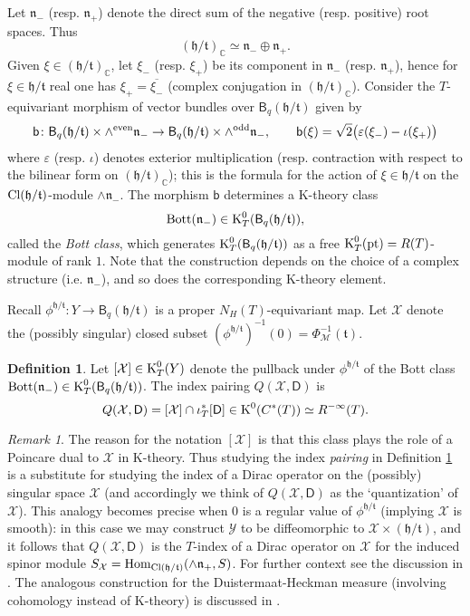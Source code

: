 \documentclass[11pt,reqno]{amsart}
\theoremstyle{definition}
\newtheorem{definition}[theorem]{Definition}
\theoremstyle{remark}
\newtheorem{remark}[theorem]{Remark}
\newcommand{\ol}[1]{\overline{#1}}
\newcommand{\st}[1]{\mathsf{#1}}
\newcommand{\tn}[1]{\textnormal{#1}}
\def\t{\ensuremath{\mathfrak{t}}}
\def\h{\ensuremath{\mathfrak{h}}}
\def\n{\ensuremath{\mathfrak{n}}}
\def\Y{\ensuremath{\mathcal{Y}}}
\def\K{\ensuremath{\mathcal{K}}}
\def\X{\ensuremath{\mathcal{X}}}
\def\M{\ensuremath{\mathcal{M}}}
\def\bC{\ensuremath{\mathbb{C}}}
\def\Hom{\ensuremath{\textnormal{Hom}}}
\def\Cl{\ensuremath{\textnormal{Cl}}}
\def\pt{\ensuremath{\textnormal{pt}}}
\def\K{\ensuremath{\textnormal{K}}}
\def\Bott{\ensuremath{\textnormal{Bott}}}
\begin{document}
Let $\n_-$ (resp. $\n_+$) denote the direct sum of the negative (resp. positive) root spaces.  Thus 
\[ (\h/\t)_{\bC} \simeq \n_- \oplus \n_+. \]
Given $\xi \in (\h/\t)_{\bC}$, let $\xi_-$ (resp. $\xi_+$) be its component in $\n_-$ (resp. $\n_+$), hence for $\xi \in \h/\t$ real one has $\xi_+=\ol{\xi_-}$ (complex conjugation in $(\h/\t)_{\bC}$).  Consider the $T$-equivariant morphism of vector bundles over $\st{B}_q(\h/\t)$ given by
\[ \st{b} \colon \st{B}_q(\h/\t) \times \wedge^{\tn{even}}\n_- \rightarrow \st{B}_q(\h/\t) \times \wedge^{\tn{odd}}\n_-, \qquad \st{b}(\xi)=\sqrt{2}\big(\varepsilon(\xi_-)-\iota(\xi_+)\big)\]
where $\varepsilon$ (resp. $\iota$) denotes exterior multiplication (resp. contraction with respect to the bilinear form on $(\h/\t)_{\bC}$); this is the formula for the action of $\xi \in \h/\t$ on the $\Cl(\h/\t)$-module $\wedge \n_-$.  The morphism $\st{b}$ determines a K-theory class
\[ \Bott(\n_-) \in \K^0_T(\st{B}_q(\h/\t)),\]
called the \emph{Bott class}, which generates $\K^0_T(\st{B}_q(\h/\t))$ as a free $\K^0_T(\pt)=R(T)$-module of rank $1$.  Note that the construction depends on the choice of a complex structure (i.e. $\n_-$), and so does the corresponding K-theory element.

Recall $\phi^{\h/\t} \colon Y \rightarrow \st{B}_q(\h/\t)$ is a proper $N_H(T)$-equivariant map.  Let $\X$ denote the (possibly singular) closed subset $(\phi^{\h/\t})^{-1}(0)=\Phi_{\M}^{-1}(\t)$.
\begin{definition}
\label{def:QuantX}
Let $[\X]\in \K^0_T(Y)$ denote the pullback under $\phi^{\h/\t}$ of the Bott class $\Bott(\n_-) \in \K^0_T(\st{B}_q(\h/\t))$.  The index pairing $Q(\X,\st{D})$ is
\[ Q(\X,\st{D})=[\X] \cap \iota_T^\ast [\st{D}] \in \K^0(C^\ast(T))\simeq R^{-\infty}(T).\]
\end{definition}
\begin{remark}
The reason for the notation $[\X]$ is that this class plays the role of a Poincare dual to $\X$ in K-theory.  Thus studying the index \emph{pairing} in Definition \ref{def:QuantX} is a substitute for studying the index of a Dirac operator on the (possibly) singular space $\X$ (and accordingly we think of $Q(\X,\st{D})$ as the `quantization' of $\X$).  This analogy becomes precise when $0$ is a regular value of $\phi^{\h/\t}$ (implying $\X$ is smooth): in this case we may construct $\Y$ to be diffeomorphic to $\X \times (\h/\t)$, and it follows that $Q(\X,\st{D})$ is the $T$-index of a Dirac operator on $\X$ for the induced spinor module $S_{\X}=\Hom_{\Cl(\h/\t)}(\wedge \n_+,S)$.  For further context see the discussion in \cite[Section 6]{LMSspinor}.  The analogous construction for the Duistermaat-Heckman measure (involving cohomology instead of K-theory) is discussed in \cite{DHNormSquare}.  
\end{remark}
\end{document}
